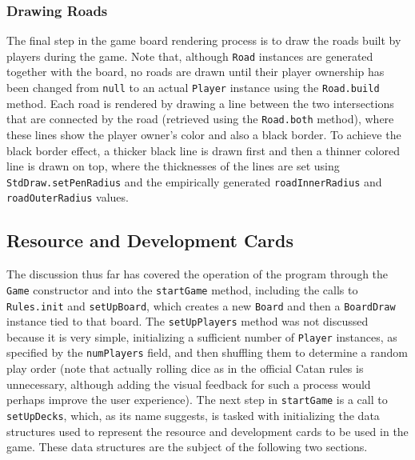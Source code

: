 \documentclass[pageno]{jpaper}
\begin{document}
\begin{doublespacing}
\hypertarget{sec:drawing_roads}{}
\subsubsection{Drawing Roads}

The final step in the game board rendering process is to draw the roads built by players during the game. Note that, although \lstinline$Road$ instances are generated together with the board, no roads are drawn until their player ownership has been changed from \lstinline$null$ to an actual \lstinline$Player$ instance using the \lstinline$Road.build$ method. Each road is rendered by drawing a line between the two intersections that are connected by the road (retrieved using the \lstinline$Road.both$ method), where these lines show the player owner's color and also a black border. To achieve the black border effect, a thicker black line is drawn first and then a thinner colored line is drawn on top, where the thicknesses of the lines are set using \lstinline$StdDraw.setPenRadius$ and the empirically generated \lstinline$roadInnerRadius$ and \lstinline$roadOuterRadius$ values. 

\hypertarget{sec:resource_and_development_cards}{}
\subsection{Resource and Development Cards}

The discussion thus far has covered the operation of the program through the \lstinline$Game$ constructor and into the \lstinline$startGame$ method, including the calls to \lstinline$Rules.init$ and \lstinline$setUpBoard$, which creates a new \lstinline$Board$ and then a \lstinline$BoardDraw$ instance tied to that board. The \lstinline$setUpPlayers$ method was not discussed because it is very simple, initializing a sufficient number of \lstinline$Player$ instances, as specified by the \lstinline$numPlayers$ field, and then shuffling them to determine a random play order (note that actually rolling dice as in the official Catan rules is unnecessary, although adding the visual feedback for such a process would perhaps improve the user experience). The next step in \lstinline$startGame$ is a call to \lstinline$setUpDecks$, which, as its name suggests, is tasked with initializing the data structures used to represent the resource and development cards to be used in the game. These data structures are the subject of the following two sections.

\hypertarget{sec:the_resource_and_resourcebundle_data_types}{}

\end{doublespacing}
\end{document}
